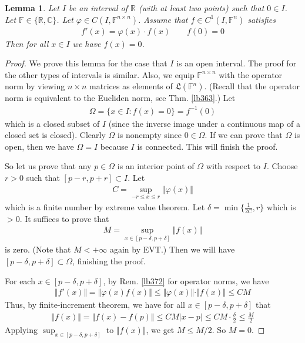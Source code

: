 \documentclass[12pt,b5paper,notitlepage]{article}
\theoremstyle{definition}
\theoremstyle{plain}
\newtheorem{lm}[df]{Lemma}
\newcommand{\fk}{\mathfrak}
\newcommand{\Cbb}{\mathbb C}
\newcommand{\Rbb}{\mathbb R}
\newcommand{\Fbb}{\mathbb F}
\numberwithin{equation}{section}
\begin{document}
\begin{lm}
Let $I$ be an interval of $\Rbb$ (with at least two points) such that $0\in I$. Let $\Fbb\in\{\Rbb,\Cbb\}$. Let $\varphi\in C(I,\Fbb^{n\times n})$. Assume that $f\in C^1(I,\Fbb^n)$ satisfies
\begin{align}
f'(x)=\varphi(x)\cdot f(x)\qquad f(0)=0
\end{align} 
Then for all $x\in I$ we have $f(x)=0$.
\end{lm}

\begin{proof}
We prove this lemma for the case that $I$ is an open interval. The proof for the other types of intervals is similar. Also, we equip $\Fbb^{n\times n}$ with the operator norm by viewing $n\times n$ matrices as elements of $\fk L(\Fbb^n)$. (Recall that the operator norm is equivalent to the Eucliden norm, see Thm. \ref{lb363}.) Let
\begin{align*}
\Omega=\{x\in I:f(x)=0\}=f^{-1}(0)
\end{align*}
which is a closed subset of $I$ (since the inverse image under a continuous map of a closed set is closed). Clearly $\Omega$ is nonempty since $0\in\Omega$. If we can prove that $\Omega$ is open, then we have $\Omega=I$ because $I$ is connected. This will finish the proof.

So let us prove that any $p\in\Omega$ is an interior point of $\Omega$ with respect to $I$. Choose $r>0$ such that $[p-r,p+r]\subset I$. Let
\begin{align*}
C=\sup_{-r\leq x\leq r}\Vert\varphi(x)\Vert
\end{align*}
which is a finite number by extreme value theorem. Let $\delta=\min\{\frac 1{2C},r\}$ which is $>0$. It suffices to prove that
\begin{align*}
M=\sup_{x\in[p-\delta,p+\delta]}\Vert f(x)\Vert
\end{align*}
is zero. (Note that $M<+\infty$ again by EVT.) Then we will have $[p-\delta,p+\delta]\subset\Omega$, finishing the proof. 

For each $x\in[p-\delta,p+\delta]$, by Rem. \ref{lb372} for operator norms, we have
\begin{align*}
\Vert f'(x)\Vert=\Vert\varphi(x)f(x)\Vert\leq\Vert\varphi(x)\Vert\cdot \Vert f(x)\Vert\leq CM
\end{align*}
Thus, by finite-increment theorem, we have for all $x\in[p-\delta,p+\delta]$ that
\begin{align*}
\Vert f(x)\Vert=\Vert f(x)-f(p)\Vert\leq CM|x-p|\leq CM\cdot\frac{\delta}2\leq \frac M2
\end{align*}
Applying $\sup_{x\in[p-\delta,p+\delta]}$ to $\Vert f(x)\Vert$, we get $M\leq M/2$. So $M=0$.
\end{proof}
\end{document}
